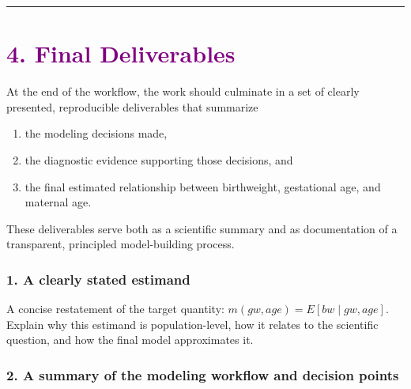 \documentclass[
  letterpaper,
  DIV=11,
  numbers=noendperiod]{scrreprt}
\providecommand{\tightlist}{%
  \setlength{\itemsep}{0pt}\setlength{\parskip}{0pt}}\usepackage{longtable,booktabs,array}
\begin{document}
\begin{center}\rule{0.5\linewidth}{0.5pt}\end{center}

\hypertarget{section-62}{%
\section*{\texorpdfstring{\textcolor{purple}{4. Final Deliverables}}{}}\label{section-62}}

\markright{\textcolor{purple}{4. Final Deliverables}}

At the end of the workflow, the work should culminate in a set of
clearly presented, reproducible deliverables that summarize

\begin{enumerate}
\def\labelenumi{(\roman{enumi})}
\tightlist
\item
  the modeling decisions made,
\item
  the diagnostic evidence supporting those decisions, and
\item
  the final estimated relationship between birthweight, gestational age,
  and maternal age.
\end{enumerate}

These deliverables serve both as a scientific summary and as
documentation of a transparent, principled model-building process.

\hypertarget{a-clearly-stated-estimand}{%
\subsubsection*{\texorpdfstring{\textbf{1. A clearly stated
estimand}}{1. A clearly stated estimand}}\label{a-clearly-stated-estimand}}

A concise restatement of the target quantity:
\(m(gw, age) = E[bw \mid gw, age]\). Explain why this estimand is
population-level, how it relates to the scientific question, and how the
final model approximates it.

\hypertarget{a-summary-of-the-modeling-workflow-and-decision-points}{%
\subsubsection*{\texorpdfstring{\textbf{2. A summary of the modeling
workflow and decision
points}}{2. A summary of the modeling workflow and decision points}}\label{a-summary-of-the-modeling-workflow-and-decision-points}}
\end{document}

